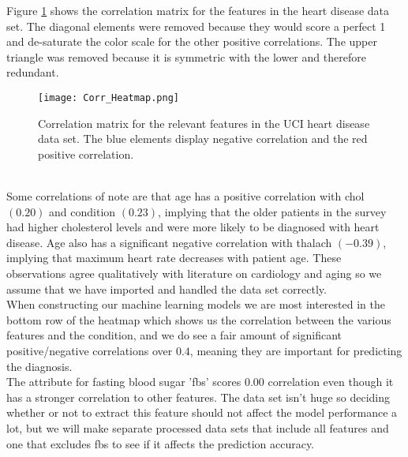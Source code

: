 \documentclass[reprint,english,notitlepage]{revtex4-1}  %
\begin{document}
Figure \ref{fig:corr} shows the correlation matrix for the features in the heart disease data set. The diagonal elements were removed because they would score a perfect 1 and de-saturate the color scale for the other positive correlations. The upper triangle was removed because it is symmetric with the lower and therefore redundant.
\begin{figure}[h!]
    \centering
    \texttt{[image: Corr\_Heatmap.png]}
    \caption{Correlation matrix for the relevant features in the UCI heart disease data set. The blue elements display negative correlation and the red positive correlation.}
    \label{fig:corr}
\end{figure}
\vspace{3mm}
\\
Some correlations of note are that age has a positive correlation with chol $(0.20)$ and condition $(0.23)$, implying that the older patients in the survey had higher cholesterol levels and were more likely to be diagnosed with heart disease. Age also has a significant negative correlation with thalach $(-0.39)$, implying that maximum heart rate decreases with patient age. These observations agree qualitatively with literature on cardiology and aging \cite{heart_age} so we assume that we have imported and handled the data set correctly.
\vspace{3mm}
\\
When constructing our machine learning models we are most interested in the bottom row of the heatmap which shows us the correlation between the various features and the condition, and we do see a fair amount of significant positive/negative correlations over $0.4$, meaning they are important for predicting the diagnosis.
\vspace{3mm}
\\
The attribute for fasting blood sugar 'fbs' scores 0.00 correlation even though it has a stronger correlation to other features. The data set isn't huge so deciding whether or not to extract this feature should not affect the model performance a lot, but we will make separate processed data sets that include all features and one that excludes fbs to see if it affects the prediction accuracy.
\end{document}
